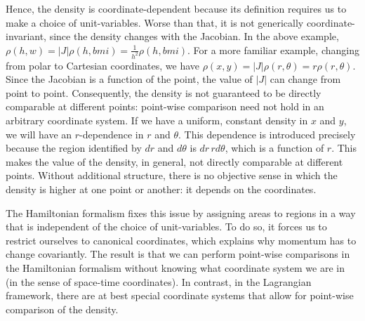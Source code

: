 \documentclass[letterpaper]{article}
\begin{document}
Hence, the density is coordinate-dependent because its definition requires us to make a choice of unit-variables. Worse than that, it is not generically coordinate-invariant, since the density changes with the Jacobian. In the above example, $\rho(h,w) = |J| \rho(h, bmi) = \frac{1}{h^2} \rho(h, bmi)$. For a more familiar example, changing from polar to Cartesian coordinates, we have $\rho(x,y) = |J| \rho(r, \theta) = r \rho(r, \theta)$. Since the Jacobian is a function of the point, the value of $|J|$ can change from point to point. Consequently, the density is not guaranteed to be directly comparable at different points: point-wise comparison need not hold in an arbitrary coordinate system. If we have a uniform, constant density in $x$ and $y$, we will have an $r$-dependence in $r$ and $\theta$. This dependence is introduced precisely because the region identified by $dr$ and $d\theta$ is $dr \,r d\theta$, which is a function of $r$. This makes the value of the density, in general, not directly comparable at different points. Without additional structure, there is no objective sense in which the density is higher at one point or another: it depends on the coordinates.


The Hamiltonian formalism fixes this issue by assigning areas to regions in a way that is independent of the choice of unit-variables. To do so, it forces us to restrict ourselves to canonical coordinates, which explains why momentum has to change covariantly. The result is that we can perform point-wise comparisons in the Hamiltonian formalism without knowing what coordinate system we are in (in the sense of space-time coordinates). In contrast, in the Lagrangian framework, there are at best special coordinate systems that allow for point-wise comparison of the density.
\end{document}
